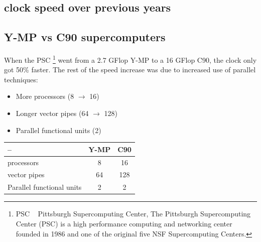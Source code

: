 \documentclass[12pt, a4paper]{book}
\begin{document}
\subsection{clock speed over previous years}
\begin{figure}[!h]
    \centering
\end{figure}

\subsection{Y-MP vs C90 supercomputers}
When the PSC \footnote{PSC ~ Pittsburgh Supercomputing Center, The Pittsburgh Supercomputing Center (PSC) is a high performance computing and networking center founded in 1986 and one of the original five NSF Supercomputing Centers.} went from a 2.7 GFlop Y-MP
to a 16 GFlop C90, the clock only got 50\%
faster. The rest of the speed increase was
due to increased use of parallel techniques:
\begin{itemize}
    \item More processors (8 $\rightarrow$ 16)
    \item Longer vector pipes (64 $\rightarrow$ 128)
    \item Parallel functional units (2)
\end{itemize}

\begin{table}[h]
    \centering
    \begin{tabular}{l|c|c}
        --                        & Y-MP & C90 \\
        \hline
        processors                & 8    & 16  \\
        \hline
        vector pipes              & 64   & 128 \\
        \hline
        Parallel functional units & 2    & 2   \\
    \end{tabular}
\end{table}
\end{document}
